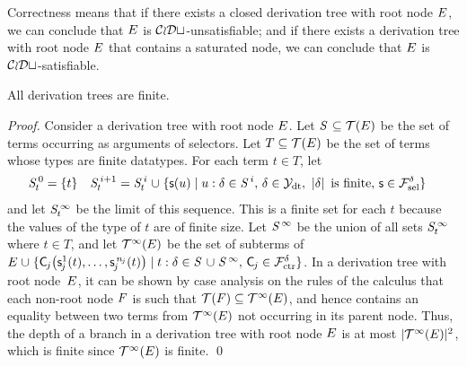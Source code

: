 Correctness means that if there exists a closed derivation tree with root node
$E$, we can conclude that $E$ is $\mathcal{CoDt}$-unsatisfiable; and if there exists
a derivation tree with root node $E$ that contains a saturated node, we can
conclude that $E$ is $\mathcal{CoDt}$-satisfiable.

\begin{theorem}[Termination]%
\label{thm:t}%
\afterDot
All derivation trees are finite.
\end{theorem}
\begin{proof}
Consider a derivation tree with root node $E$.
Let $\SSS \subseteq \tEc$ be the set of terms occurring as arguments of selectors.
Let $T \subseteq \mathcal{T}(E)$ be the set of terms whose types are finite datatypes.
For each term $t \in T$\negvthinspace,
let
\begin{align*}
\smash{\mathit{S}^{\,0}_t} & = \{ t \}
& \smash{\mathit{S}^{\,i+1}_t} & = \smash{\mathit{S}^{\,i}_t \mathrel\cup \{ \textsf{s}( u ) \mid u : \delta \in \mathit{S}^{\,i}{,}~ \delta \in \mathcal{Y}_{\mathrm{dt}}{,}~ \left|\delta\right| \text{ is finite}{,}~ \textsf{s} \in \mathcal{F}_{\mathrm{sel}}^{\delta}}  \}
\end{align*}
and let $\mathit{S}^{\,\infty}_t$ be the limit of this sequence.
This is a finite set for each $t$ because the values of the type of $t$ are of finite size.
Let $\mathit{S}^{\,\infty}$ be the union of all sets $\mathit{S}^{\,\infty}_t$ where $t \in T$,
and let $\mathcal{T}^\infty(E)$ be the set of subterms of $\Ec \mathrel\cup \{ \const C_{\negvthinspace j}\bigl( \const s^1_{\negvthinspace j}( t ), \ldots, \const s^{\smash{\,n_{\negvthinspace j}}}_{\negvthinspace j}( t ) \bigr) \mid t : \delta \in \SSS \mathrel\cup \SSSS \AST{,}~ \const C_{\negvthinspace j} \in \Ctr^\delta \}$.
In a derivation tree with root node~$E$,
it can be shown by case analysis on the rules of the calculus that each non-root node $F$ is such that
$\mathcal{T}(F) \subseteq \mathcal{T}^\infty(E)$, and hence contains an equality between two terms from $\mathcal{T}^\infty(E)$ not occurring in its parent node.
Thus, the depth of a branch in a derivation tree with root node $E$ is at most $\left| \smash{\mathcal{T}^\infty(E)}\vphantom{X} \right|{\!}^2$,
which is finite since $\mathcal{T}^\infty(E)$ is finite.
\qed
\end{proof}

